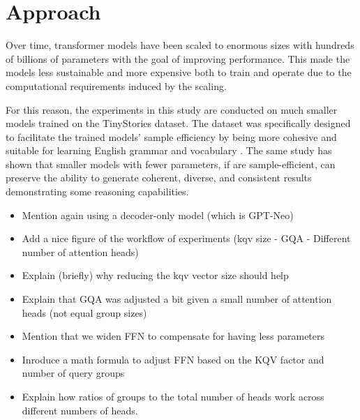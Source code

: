 \section{Approach}



Over time, transformer models have been scaled to enormous sizes with hundreds of billions of parameters with the goal of improving performance. This made the models less sustainable and more expensive both to train and operate due to the computational requirements induced by the scaling. 

For this reason, the experiments in this study are conducted on much smaller models trained on the TinyStories dataset. The dataset was specifically designed to facilitate the trained models' sample efficiency by being more cohesive and suitable for learning English grammar and vocabulary \cite{eldan_tinystories_2023}. The same study has shown that smaller models with fewer parameters, if are sample-efficient, can preserve the ability to generate coherent, diverse, and consistent results demonstrating some reasoning capabilities. 

\begin{itemize}
    \item Mention again using a decoder-only model (which is GPT-Neo)
    \item Add a nice figure of the workflow of experiments (kqv size - GQA - Different number of attention heads)
    \item Explain (briefly) why reducing the kqv vector size should help
    \item Explain that GQA was adjusted a bit given a small number of attention heads (not equal group sizes)
    \item Mention that we widen FFN to compensate for having less parameters \cite{shazeer_fast_2019}
    \item Inroduce a math formula to adjust FFN based on the KQV factor and number of query groups
    \item Explain how ratios of groups to the total number of heads work across different numbers of heads.
\end{itemize}



